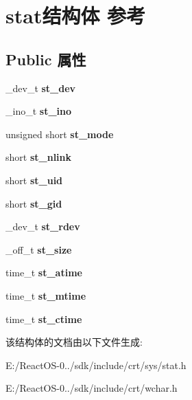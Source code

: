 \hypertarget{structstat}{}\section{stat结构体 参考}
\label{structstat}
\subsection*{Public 属性}
\begin{DoxyCompactItemize}
\item 
\mbox{\label{structstat_a8245ae61b60e06f7b06e1ea59b0be188}} 
\+\_\+dev\+\_\+t {\bfseries st\+\_\+dev}
\item 
\mbox{\label{structstat_aa055926d1bb65c01d327b835bd84819a}} 
\+\_\+ino\+\_\+t {\bfseries st\+\_\+ino}
\item 
\mbox{\label{structstat_a7278b9464298495a4c0d7a722598392a}} 
unsigned short {\bfseries st\+\_\+mode}
\item 
\mbox{\label{structstat_afeb6ecefe19dc63fb332d5a2f31aba34}} 
short {\bfseries st\+\_\+nlink}
\item 
\mbox{\label{structstat_a8bd5d3f43b3f716f914684777a8cb00e}} 
short {\bfseries st\+\_\+uid}
\item 
\mbox{\label{structstat_a25aec8c9d90650c28ad77691cf190ce9}} 
short {\bfseries st\+\_\+gid}
\item 
\mbox{\label{structstat_aa705f388daf0d0bf7996ad221baf509b}} 
\+\_\+dev\+\_\+t {\bfseries st\+\_\+rdev}
\item 
\mbox{\label{structstat_ab55b3ddf695eb2a5241853311a49cd7a}} 
\+\_\+off\+\_\+t {\bfseries st\+\_\+size}
\item 
\mbox{\label{structstat_ab74d1e7e345e88b9d0fb2688a97cba64}} 
time\+\_\+t {\bfseries st\+\_\+atime}
\item 
\mbox{\label{structstat_a77e235090f8cb6897f1c0ce65689006b}} 
time\+\_\+t {\bfseries st\+\_\+mtime}
\item 
\mbox{\label{structstat_a1b4b858db1ebe79c3d6e0fc1ef721024}} 
time\+\_\+t {\bfseries st\+\_\+ctime}
\end{DoxyCompactItemize}


该结构体的文档由以下文件生成\+:\begin{DoxyCompactItemize}
\item 
E\+:/\+React\+O\+S-\/0../sdk/include/crt/sys/stat.\+h\item 
E\+:/\+React\+O\+S-\/0../sdk/include/crt/wchar.\+h\end{DoxyCompactItemize}

